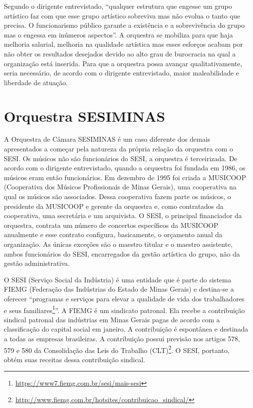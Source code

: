 \documentclass[a4paper, 12pt, openright, oneside, german, french, english, brazil]{abntex2}
\begin{document}
	Segundo o dirigente entrevistado, ``qualquer estrutura que engesse um grupo artístico faz com que esse grupo artístico sobreviva mas não evolua o tanto que precisa. O funcionarismo público garante a existência e a sobrevivência do grupo mas o engessa em inúmeros aspectos''. A orquestra se mobiliza para que haja melhoria salarial, melhoria na qualidade artística mas esses esforços acabam por não obter os resultados desejados devido ao alto grau de burocracia na qual a organização está inserida. Para que a orquestra possa avançar qualitativamente, seria necessário, de acordo com o dirigente entrevistado, maior maleabilidade e liberdade de atuação.
	
	
	
	
	
	\section{Orquestra SESIMINAS}
	
	A Orquestra de Câmara SESIMINAS é um caso diferente dos demais apresentados a começar pela natureza da própria relação da orquestra com o SESI. Os músicos não são funcionários do SESI, a orquestra é terceirizada. De acordo com o dirigente entrevistado, quando a orquestra foi fundada em 1986, os músicos eram então funcionários. Em dezembro de 1995 foi criada a MUSICOOP (Cooperativa dos Músicos Profissionais de Minas Gerais), uma cooperativa na qual os músicos são associados. Dessa cooperativa fazem parte os músicos, o presidente da MUSICOOP e gerente da orquestra e, como contratados da cooperativa, uma secretária e um arquivista. O SESI, o principal financiador da orquestra, contrata um número de concertos específicos da MUSICOOP anualmente e esse contrato configura, basicamente, o orçamento anual da organização. As únicas exceções são o maestro titular e o maestro assistente, ambos funcionários do SESI, encarregados da gestão artística do grupo, não da gestão administrativa.
	
	O SESI (Serviço Social da Indústria) é uma entidade que é parte do sistema FIEMG (Federação das Indústrias do Estado de Minas Gerais) e destina-se a oferecer ``programas e serviços para elevar a qualidade de vida dos trabalhadores e seus familiares\footnote{\url{https://www7.fiemg.com.br/sesi/mais-sesi}}''. A FIEMG é um sindicato patronal. Ela recebe a contribuição sindical patronal das indústrias em Minas Gerais pagas de acordo com a classificação do capital social em janeiro. A contribuição é espontânea e destinada a todas as empresas brasileiras. A contribuição possui previsão nos artigos 578, 579 e 580 da Consolidação das Leis do Trabalho (CLT)\footnote{\url{http://www.fiemg.com.br/hotsites/contribuicao_sindical/}}. O SESI, portanto, obtém suas receitas dessa contribuição sindical.
	
\end{document}
